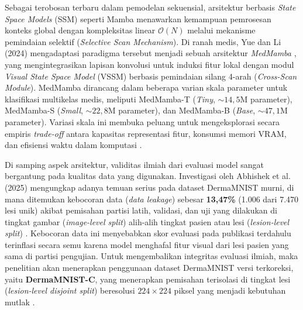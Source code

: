 Sebagai terobosan terbaru dalam pemodelan sekuensial, arsitektur berbasis \textit{State Space Models} (SSM) seperti Mamba \cite{gu2024mamba} menawarkan kemampuan pemrosesan konteks global dengan kompleksitas linear $\mathcal{O}(N)$ melalui mekanisme pemindaian selektif (\textit{Selective Scan Mechanism}). Di ranah medis, Yue dan Li (2024) mengadaptasi paradigma tersebut menjadi sebuah arsitektur \textit{MedMamba} \cite{yue2024medmamba}, yang mengintegrasikan lapisan konvolusi untuk induksi fitur lokal dengan modul \textit{Visual State Space Model} (VSSM) berbasis pemindaian silang 4-arah (\textit{Cross-Scan Module}). MedMamba dirancang dalam beberapa varian skala parameter untuk klasifikasi multikelas medis, meliputi MedMamba-T (\textit{Tiny}, $\sim 14{,}5\text{M}$ parameter), MedMamba-S (\textit{Small}, $\sim 22{,}8\text{M}$ parameter), dan MedMamba-B (\textit{Base}, $\sim 47{,}1\text{M}$ parameter). Variasi skala ini membuka peluang untuk mengeksplorasi secara empiris \textit{trade-off} antara kapasitas representasi fitur, konsumsi memori VRAM, dan efisiensi waktu dalam komputasi \cite{aalishah2025medmambalite}.\par

Di samping aspek arsitektur, validitas ilmiah dari evaluasi model sangat bergantung pada kualitas data yang digunakan. Investigasi oleh Abhishek et al. (2025) mengungkap adanya temuan serius pada dataset DermaMNIST murni, di mana ditemukan kebocoran data (\textit{data leakage}) sebesar \textbf{13,47\%} (1.006 dari 7.470 lesi unik) akibat pemisahan partisi latih, validasi, dan uji yang dilakukan di tingkat gambar (\textit{image-level split}) alih-alih tingkat pasien atau lesi (\textit{lesion-level split}) \cite{abhishek2025investigating}. Kebocoran data ini menyebabkan skor evaluasi pada publikasi terdahulu terinflasi secara semu karena model menghafal fitur visual dari lesi pasien yang sama di partisi pengujian. Untuk mengembalikan integritas evaluasi ilmiah, maka penelitian akan menerapkan penggunaan  dataset DermaMNIST versi terkoreksi, yaitu \textbf{DermaMNIST-C}, yang menerapkan pemisahan terisolasi di tingkat lesi (\textit{lesion-level disjoint split}) beresolusi $224 \times 224$ piksel yang menjadi kebutuhan mutlak \cite{abhishek2025investigating}.\par

